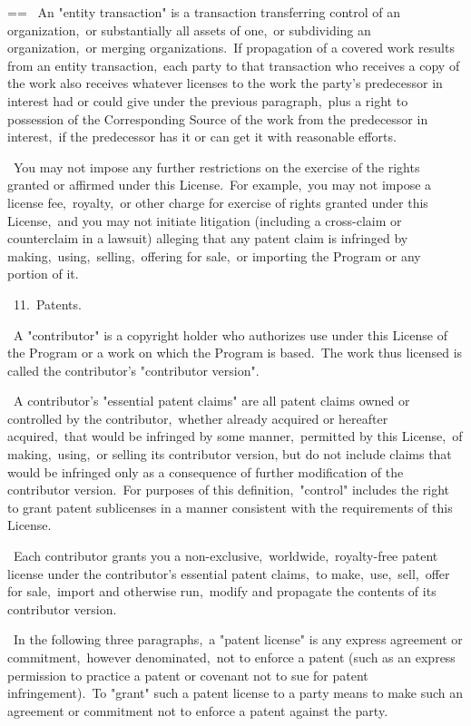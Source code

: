 \documentclass{book}
\makeatletter
\newenvironment{Texinfopreformatted}{%
  \par\GNUTobeylines\obeyspaces\frenchspacing\parskip=\z@\parindent=\z@}{}
{\catcode`\^^M=13 \gdef\GNUTobeylines{\catcode`\^^M=13 \def^^M{\null\par}}}
\newenvironment{Texinfoindented}{\begin{list}{}{}\item\relax}{\end{list}}
\renewcommand{\_}{\Texinfounderscore\discretionary{}{}{}}
\makeatother
\begin{document}
\begin{Texinfoindented}
\begin{Texinfopreformatted}
\  An "entity transaction" is a transaction transferring control of an
organization,\ or substantially all assets of one,\ or subdividing an
organization,\ or merging organizations.\  If propagation of a covered
work results from an entity transaction,\ each party to that
transaction who receives a copy of the work also receives whatever
licenses to the work the party's predecessor in interest had or could
give under the previous paragraph,\ plus a right to possession of the
Corresponding Source of the work from the predecessor in interest,\ if
the predecessor has it or can get it with reasonable efforts.

\  You may not impose any further restrictions on the exercise of the
rights granted or affirmed under this License.\  For example,\ you may
not impose a license fee,\ royalty,\ or other charge for exercise of
rights granted under this License,\ and you may not initiate litigation
(including a cross-claim or counterclaim in a lawsuit) alleging that
any patent claim is infringed by making,\ using,\ selling,\ offering for
sale,\ or importing the Program or any portion of it.

\  11.\ Patents.

\  A "contributor" is a copyright holder who authorizes use under this
License of the Program or a work on which the Program is based.\  The
work thus licensed is called the contributor's "contributor version".

\  A contributor's "essential patent claims" are all patent claims
owned or controlled by the contributor,\ whether already acquired or
hereafter acquired,\ that would be infringed by some manner,\ permitted
by this License,\ of making,\ using,\ or selling its contributor version,
but do not include claims that would be infringed only as a
consequence of further modification of the contributor version.\  For
purposes of this definition,\ "control" includes the right to grant
patent sublicenses in a manner consistent with the requirements of
this License.

\  Each contributor grants you a non-exclusive,\ worldwide,\ royalty-free
patent license under the contributor's essential patent claims,\ to
make,\ use,\ sell,\ offer for sale,\ import and otherwise run,\ modify and
propagate the contents of its contributor version.

\  In the following three paragraphs,\ a "patent license" is any express
agreement or commitment,\ however denominated,\ not to enforce a patent
(such as an express permission to practice a patent or covenant not to
sue for patent infringement).\  To "grant" such a patent license to a
party means to make such an agreement or commitment not to enforce a
patent against the party.


\end{Texinfopreformatted}
\end{Texinfoindented}
\end{document}
